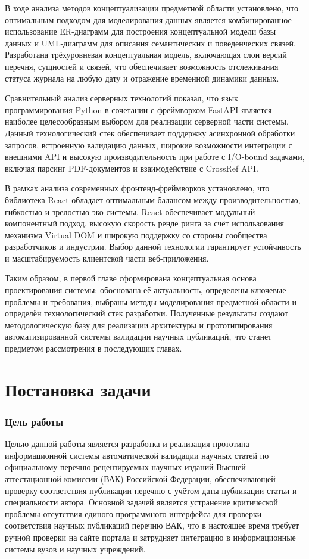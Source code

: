В ходе анализа методов концептуализации предметной области установлено, что оптимальным
подходом для моделирования данных является комбинированное использование
ER-диаграмм для построения концептуальной модели базы данных и UML-диаграмм для
описания семантических и поведенческих связей. Разработана трёхуровневая концептуальная
модель, включающая слои версий перечня, сущностей и связей, что обеспечивает возможность 
отслеживания статуса журнала на любую дату и отражение временной динамики данных.

Сравнительный анализ серверных технологий показал, что язык программирования Python
в сочетании с фреймворком FastAPI является наиболее целесообразным выбором для реализации 
серверной части системы. Данный технологический стек обеспечивает поддержку
асинхронной обработки запросов, встроенную валидацию данных, широкие возможности
интеграции с внешними API и высокую производительность при работе с I/O-bound задачами,
включая парсинг PDF-документов и взаимодействие с CrossRef API.

В рамках анализа современных фронтенд-фреймворков установлено, что библиотека React
обладает оптимальным балансом между производительностью, гибкостью и зрелостью эко
системы. React обеспечивает модульный компонентный подход, высокую скорость ренде
ринга за счёт использования механизма Virtual DOM и широкую поддержку со стороны 
сообщества разработчиков и индустрии. Выбор данной технологии гарантирует устойчивость
и масштабируемость клиентской части веб-приложения.

Таким образом, в первой главе сформирована концептуальная основа проектирования
системы: обоснована её актуальность, определены ключевые проблемы и требования, выбраны 
методы моделирования предметной области и определён технологический стек разработки.
Полученные результаты создают методологическую базу для реализации 
архитектуры и прототипирования автоматизированной системы валидации научных публикаций,
что станет предметом рассмотрения в последующих главах.

\section{Постановка задачи}

\subsubsection{Цель работы}

Целью данной работы является разработка и реализация прототипа информационной системы
автоматической валидации научных статей по официальному перечню рецензируемых
научных изданий Высшей аттестационной комиссии (ВАК) Российской Федерации,
обеспечивающей проверку соответствия публикации перечню с учётом даты публикации
статьи и специальности автора.
Основной задачей является устранение критической проблемы отсутствия единого программного
интерфейса для проверки соответствия научных публикаций перечню ВАК, что
в настоящее время требует ручной проверки на сайте портала и затрудняет интеграцию в
информационные системы вузов и научных учреждений.

